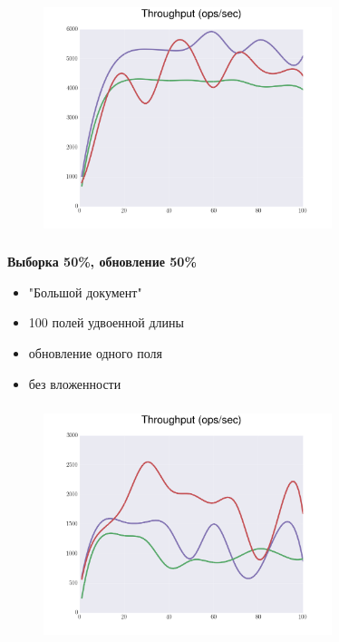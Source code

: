 \documentclass[usenames,dvipsnames, 18pt, compress, aspectratio=169]{beamer}
\begin{document}
\begin{frame}
    \frametitle{}
    \begin{center}
    \begin{figure}
        \includegraphics[width=0.75\textwidth,center]{benchmarks/workload_a_journaled/throughput.png}
    \end{figure}
    \end{center}
\end{frame}

\begin{frame}
    \frametitle{}
    \begin{center}
        \textbf{Выборка 50\%, обновление 50\%}
        \begin{itemize}[label={}]
            \item "Большой документ"
            \item 100 полей удвоенной длины
            \item обновление одного поля
            \item без вложенности
        \end{itemize}
    \end{center}
\end{frame}

\begin{frame}
    \frametitle{}
    \begin{center}
    \begin{figure}
        \includegraphics[width=0.75\textwidth,center]{benchmarks/workload_a_large_document/throughput.png}
    \end{figure}
    \end{center}
\end{frame}
\end{document}
